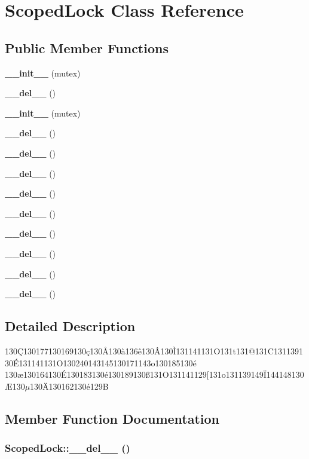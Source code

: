 \section{Scoped\-Lock Class Reference}
\label{classScopedLock}
\subsection*{Public Member Functions}
\begin{CompactItemize}
\item 
{\bf \_\-\_\-init\_\-\_\-} (mutex)
\item 
{\bf \_\-\_\-del\_\-\_\-} ()
\item 
{\bf \_\-\_\-init\_\-\_\-} (mutex)
\item 
{\bf \_\-\_\-del\_\-\_\-} ()
\item 
{\bf \_\-\_\-del\_\-\_\-} ()
\item 
{\bf \_\-\_\-del\_\-\_\-} ()
\item 
{\bf \_\-\_\-del\_\-\_\-} ()
\item 
{\bf \_\-\_\-del\_\-\_\-} ()
\item 
{\bf \_\-\_\-del\_\-\_\-} ()
\item 
{\bf \_\-\_\-del\_\-\_\-} ()
\item 
{\bf \_\-\_\-del\_\-\_\-} ()
\item 
{\bf \_\-\_\-del\_\-\_\-} ()
\end{CompactItemize}


\subsection{Detailed Description}
130\c{C}130177130169130\c{c}130\AA{}130\`{a}136\^{e}130\^{A}130\`{I}131141131O131t131@131C131139130\'{E}131141131O130240143145130171143o130185130\'{e} 130\ae{}130164130\'{E}130183130\'{e}130189130\ss{}131O131141129[131o131139149\"{I}144148130\AE{}130$\mu$130\"{A}130162130\'{e}129B



\subsection{Member Function Documentation}
\subsubsection{\setlength{\rightskip}{0pt plus 5cm}Scoped\-Lock::\_\-\_\-del\_\-\_\- ()}\label{classScopedLock_ScopedLocka11}


